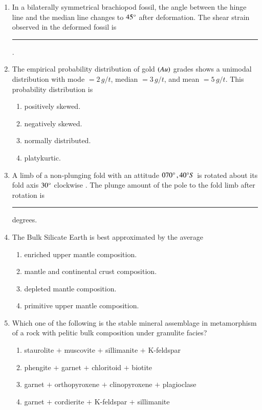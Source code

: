 \documentclass[journal,12pt,onecolumn]{IEEEtran}
\theoremstyle{remark}
\begin{document}
\begin{enumerate}
    \item In a bilaterally symmetrical brachiopod fossil, the angle between the hinge line and the median line changes to $45\degree$ after deformation. The shear strain observed in the deformed fossil is \rule{3cm}{0.15mm}. \hfill{}
    
    \item The empirical probability distribution of gold $\left(Au\right)$ grades shows a unimodal distribution with mode $=2\,g/t$, median $=3\,g/t$, and mean $=5\,g/t$. This probability distribution is \hfill{}
        \begin{enumerate} 
            \item positively skewed.
            \item negatively skewed.
            \item normally distributed.
            \item platykurtic.
        \end{enumerate}
    
    \item A limb of a non-plunging fold with an attitude $070\degree\, , 40\degree S$ is rotated about its fold axis $30\degree$ clockwise . The plunge amount of the pole to the fold limb after rotation is \rule{3cm}{0.15mm} degrees. \hfill{}
    
    \item The Bulk Silicate Earth  is best approximated by the average \hfill{}
        \begin{enumerate} 
            \item enriched upper mantle composition.
            \item mantle and continental crust composition.
            \item depleted mantle composition.
            \item primitive upper mantle composition.
        \end{enumerate}
    
    \item Which one of the following is the stable mineral assemblage in metamorphism of a rock with pelitic bulk composition under granulite facies? \hfill{}
        \begin{enumerate} 
            \item staurolite $+$ muscovite $+$ sillimanite $+$ K-feldspar 
            \item phengite $+$ garnet $+$ chloritoid $+$ biotite 
            \item garnet $+$ orthopyroxene $+$ clinopyroxene $+$ plagioclase 
            \item garnet $+$ cordierite $+$ K-feldspar $+$ sillimanite 
        \end{enumerate}
        

\end{enumerate}
\end{document}
